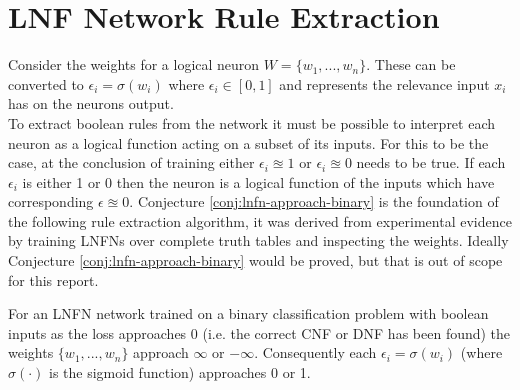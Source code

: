 \section{LNF Network Rule Extraction} \label{sec:lnfn-rule-extraction}
Consider the weights for a logical neuron $W = \{w_1, ..., w_n\}$. These can be converted to $\epsilon_i = \sigma(w_i)$ where $\epsilon_i \in [0, 1]$ and represents the relevance input $x_i$ has on the neurons output.\\

To extract boolean rules from the network it must be possible to interpret each neuron as a logical function acting on a subset of its inputs. For this to be the case, at the conclusion of training either $\epsilon_i \approxeq 1$ or $\epsilon_i \approxeq 0$ needs to be true. If each $\epsilon_i$ is either 1 or 0 then the neuron is a logical function of the inputs which have corresponding $\epsilon \approxeq 0$. Conjecture \ref{conj:lnfn-approach-binary} is the foundation of the following rule extraction algorithm, it was derived from experimental evidence by training LNFNs over complete truth tables and inspecting the weights. Ideally Conjecture \ref{conj:lnfn-approach-binary} would be proved, but that is out of scope for this report.

\begin{conjecture}
	For an LNFN network trained on a binary classification problem with boolean inputs as the loss approaches 0  (i.e. the correct CNF or DNF has been found) the weights $\{ w_1, ..., w_n \}$ approach $\infty$ or $-\infty$. Consequently each $\epsilon_i = \sigma(w_i)$ (where $\sigma(\cdot)$ is the sigmoid function) approaches 0 or 1.
	\label{conj:lnfn-approach-binary}
\end{conjecture}

